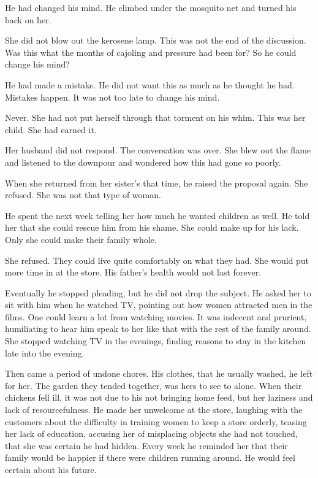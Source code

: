 \documentclass{article}
\begin{document}
He had changed his mind. He climbed under the mosquito net and turned his back on her. 

She did not blow out the kerosene lamp. This was not the end of the discussion. Was this what the months of cajoling and pressure had been for? So he could change his mind?

He had made a mistake. He did not want this as much as he thought he had. Mistakes happen. It was not too late to change his mind. 

Never. She had not put herself through that torment on his whim. This was her child. She had earned it.

Her husband did not respond. The conversation was over. She blew out the flame and listened to the downpour and wondered how this had gone so poorly. 

When she returned from her sister's that time, he raised the proposal again. She refused. She was not that type of woman.

He spent the next week telling her how much he wanted children as well. He told her that she could rescue him from his shame. She could make up for his lack. Only she could make their family whole. 

She refused. They could live quite comfortably on what they had. She would put more time in at the store. His father's health would not last forever.

Eventually he stopped pleading, but he did not drop the subject. He asked her to sit with him when he watched TV, pointing out how women attracted men in the films. One could learn a lot from watching movies. It was indecent and prurient, humiliating to hear him speak to her like that with the rest of the family around. She stopped watching TV in the evenings, finding reasons to stay in the kitchen late into the evening.

Then came a period of undone chores. His clothes, that he usually washed, he left for her. The garden they tended together, was hers to see to alone. When their chickens fell ill, it was not due to his not bringing home feed, but her laziness and lack of resourcefulness. He made her unwelcome at the store, laughing with the customers about the difficulty in training women to keep a store orderly, teasing her lack of education, accusing her of misplacing objects she had not touched, that she was certain he had hidden. Every week he reminded her that their family would be happier if there were children running around. He would feel certain about his future. 
\end{document}
